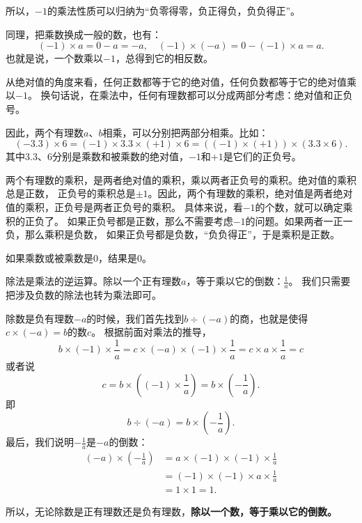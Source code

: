 \documentclass[12pt,UTF8]{ctexbook}
\begin{document}
所以，$-1$的乘法性质可以归纳为“负零得零，负正得负，负负得正”。

同理，把乘数换成一般的数，也有：
$$(-1) \times a =  0 - a = -a, \quad (-1) \times (-a) = 0 - (-1) \times a = a.$$
也就是说，一个数乘以$-1$，总得到它的相反数。

从绝对值的角度来看，任何正数都等于它的绝对值，任何负数都等于它的绝对值乘以$-1$。
换句话说，在乘法中，任何有理数都可以分成两部分考虑：绝对值和正负号。

因此，两个有理数$a$、$b$相乘，可以分别把两部分相乘。比如：
$$ (-3.3) \times 6 = (-1) \times 3.3 \times (+1) \times 6 = ((-1) \times (+1)) \times (3.3 \times 6).$$
其中$3.3$、$6$分别是乘数和被乘数的绝对值，$-1$和$+1$是它们的正负号。

两个有理数的乘积，是两者绝对值的乘积，乘以两者正负号的乘积。绝对值的乘积总是正数，
正负号的乘积总是$\pm 1$。因此，两个有理数的乘积，绝对值是两者绝对值的乘积，正负号是两者正负号的乘积。
具体来说，看$-1$的个数，就可以确定乘积的正负了。
如果正负号都是正数，那么不需要考虑$-1$的问题。如果两者一正一负，那么乘积是负数，
如果正负号都是负数，“负负得正”，于是乘积是正数。

如果乘数或被乘数是$0$，结果是$0$。

除法是乘法的逆运算。除以一个正有理数$a$，等于乘以它的倒数：$\frac{1}{a}$。
我们只需要把涉及负数的除法也转为乘法即可。

除数是负有理数$-a$的时候，我们首先找到$b \div (-a)$的商，也就是使得$c \times (-a) = b$的数$c$。
根据前面对乘法的推导，
$$ b \times (-1) \times \frac{1}{a} = c \times (-a) \times (-1) \times \frac{1}{a} = c \times a \times \frac{1}{a} = c$$
或者说
$$c = b\times \left((-1) \times \frac{1}{a}\right) = b\times \left(-\frac{1}{a}\right) .$$
即
$$b \div (-a) = b\times \left(-\frac{1}{a}\right). $$
最后，我们说明$-\frac{1}{a}$是$-a$的倒数：
\begin{align*}
    (-a) \times \left(-\frac{1}{a}\right) &= a \times (-1) \times (-1) \times \frac{1}{a} \\
    &= (-1)\times (-1) \times a \times \frac{1}{a} \\
    &= 1 \times 1 = 1.
\end{align*}

所以，无论除数是正有理数还是负有理数，\textbf{除以一个数，等于乘以它的倒数。}

\begin{center}
\end{center}
\end{document}
